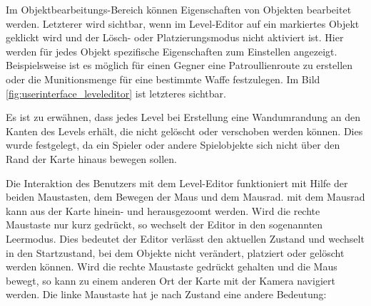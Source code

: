 Im Objektbearbeitungs-Bereich können Eigenschaften von Objekten bearbeitet werden. Letzterer wird sichtbar, wenn im Level-Editor auf ein markiertes Objekt geklickt wird und der Lösch- oder Platzierungsmodus nicht aktiviert ist. Hier werden für jedes Objekt spezifische Eigenschaften zum Einstellen angezeigt. Beispielsweise ist es möglich für einen Gegner eine Patroullienroute zu erstellen oder die Munitionsmenge für eine bestimmte Waffe festzulegen. Im Bild \ref{fig:userinterface_leveleditor} ist letzteres sichtbar. 

Es ist zu erwähnen, dass jedes Level bei Erstellung eine Wandumrandung an den Kanten des Levels erhält, die nicht gelöscht oder verschoben werden können. Dies wurde festgelegt, da ein Spieler oder andere Spielobjekte sich nicht über den Rand der Karte hinaus bewegen sollen.

Die Interaktion des Benutzers mit dem Level-Editor funktioniert mit Hilfe der beiden Maustasten, dem Bewegen der Maus und dem Mausrad. mit dem Mausrad kann aus der Karte hinein- und herausgezoomt werden. Wird die rechte Maustaste nur kurz gedrückt, so wechselt der Editor in den sogenannten \glqq{}Leermodus\grqq{}. Dies bedeutet der Editor verlässt den aktuellen Zustand und wechselt in den Startzustand, bei dem Objekte nicht verändert, platziert oder gelöscht werden können. Wird die rechte Maustaste gedrückt gehalten und die Maus bewegt, so kann zu einem anderen Ort der Karte mit der Kamera navigiert werden. Die linke Maustaste hat je nach Zustand eine andere Bedeutung:

